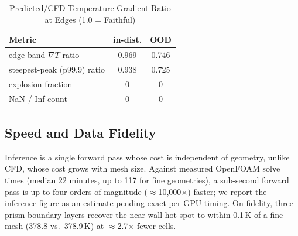 \documentclass[conference]{IEEEtran}
\begin{document}
\begin{table}[t]\renewcommand{\arraystretch}{1.2}
\caption{Predicted/CFD Temperature-Gradient Ratio at Edges (1.0 = Faithful)}
\label{tab:stab}\centering
\begin{tabular}{@{}lcc@{}}\toprule
Metric & in-dist. & OOD \\ \midrule
edge-band $\nabla T$ ratio & 0.969 & 0.746 \\
steepest-peak (p99.9) ratio & 0.938 & 0.725 \\
explosion fraction & 0 & 0 \\
NaN / Inf count & 0 & 0 \\ \bottomrule
\end{tabular}
\end{table}

\subsection{Speed and Data Fidelity}
Inference is a single forward pass whose cost is independent of geometry, unlike CFD, whose cost grows
with mesh size. Against measured OpenFOAM solve times (median 22 minutes, up to 117 for fine
geometries), a sub-second forward pass is up to four orders of magnitude ($\approx$10,000$\times$)
faster; we report the inference figure as an estimate pending exact per-GPU timing. On fidelity, three prism boundary
layers recover the near-wall hot spot to within 0.1\,K of a fine mesh (378.8 vs.\ 378.9\,K) at
$\approx$2.7$\times$ fewer cells.
\end{document}
